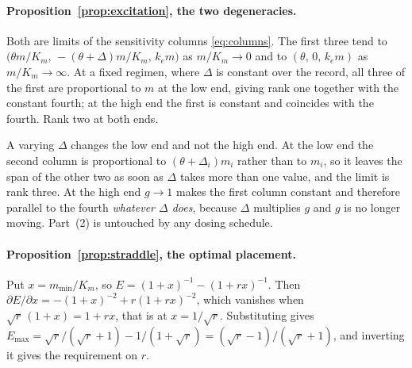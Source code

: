 \paragraph{Proposition~\ref{prop:excitation}, the two degeneracies.} Both are limits of the
sensitivity columns \eqref{eq:columns}. The first three tend to
$\bigl(\theta m/K_m,\, -(\theta+\Delta)m/K_m,\, k_e m\bigr)$ as $m/K_m \to 0$ and to
$(\theta,\, 0,\, k_e m)$ as $m/K_m \to \infty$. At a fixed regimen, where $\Delta$ is
constant over the record, all three of the first are proportional to $m$ at the low end,
giving rank one together with the constant fourth; at the high end the first is constant and
coincides with the fourth. Rank two at both ends.

A varying $\Delta$ changes the low end and not the high end. At the low end the second
column is proportional to $(\theta+\Delta_i)m_i$ rather than to $m_i$, so it leaves the span
of the other two as soon as $\Delta$ takes more than one value, and the limit is rank three.
At the high end $g \to 1$ makes the first column constant and therefore parallel to the
fourth \emph{whatever $\Delta$ does}, because $\Delta$ multiplies $g$ and $g$ is no longer
moving. Part~(2) is untouched by any dosing schedule.

\paragraph{Proposition~\ref{prop:straddle}, the optimal placement.} Put $x = m_{\min}/K_m$,
so $E = (1+x)^{-1} - (1+rx)^{-1}$. Then $\partial E/\partial x = -(1+x)^{-2} + r(1+rx)^{-2}$,
which vanishes when $\sqrt r\,(1+x) = 1 + rx$, that is at $x = 1/\sqrt r$. Substituting gives
$E_{\max} = \sqrt r/(\sqrt r + 1) - 1/(1+\sqrt r) = (\sqrt r - 1)/(\sqrt r + 1)$, and
inverting it gives the requirement on $r$.

